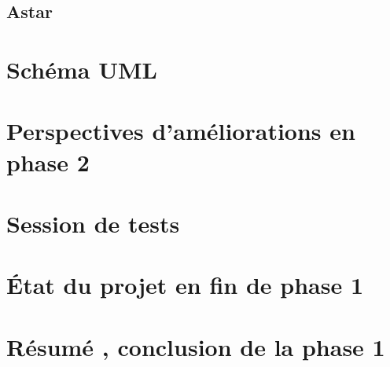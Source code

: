 \documentclass{article}
\begin{document}
		\subsection{Astar}
		\newpage
	\section{Schéma UML}
	\newpage
	\section{Perspectives d'améliorations en phase 2}
	\newpage
	\section{Session de tests}
	\newpage
	\section{État du projet en fin de phase 1}
	\section{Résumé , conclusion de la phase 1}


		

\newpage
\end{document}
